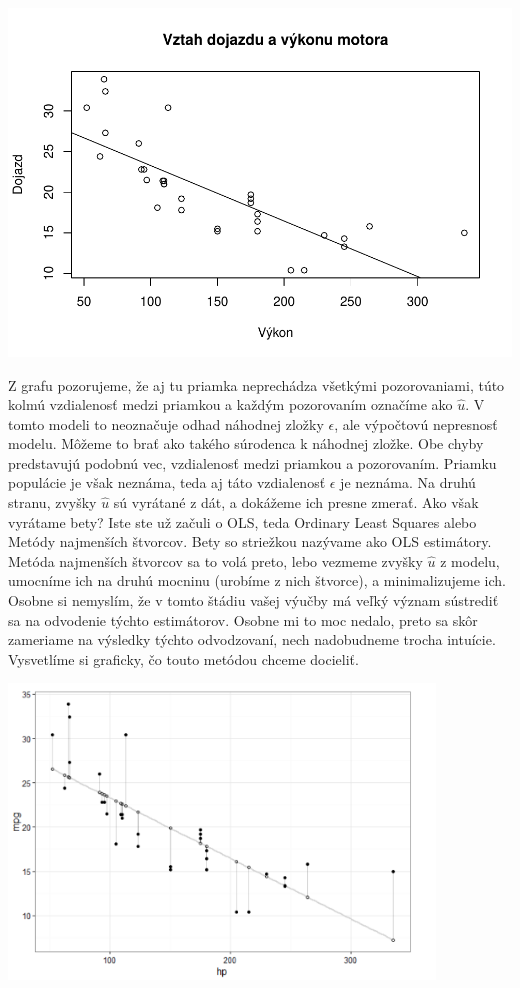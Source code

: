 \documentclass[]{article}
\begin{document}
\includegraphics{test_files/figure-latex/unnamed-chunk-41-1.pdf}

Z grafu pozorujeme, že aj tu priamka neprechádza všetkými pozorovaniami,
túto kolmú vzdialenosť medzi priamkou a každým pozorovaním označíme ako
\(\hat{u}\). V tomto modeli to neoznačuje odhad náhodnej zložky
\(\epsilon\), ale výpočtovú nepresnosť modelu. Môžeme to brať ako takého
súrodenca k náhodnej zložke. Obe chyby predstavujú podobnú vec,
vzdialenosť medzi priamkou a pozorovaním. Priamku populácie je však
neznáma, teda aj táto vzdialenosť \(\epsilon\) je neznáma. Na druhú
stranu, zvyšky \(\hat{u}\) sú vyrátané z dát, a dokážeme ich presne
zmerať. Ako však vyrátame bety? Iste ste už začuli o OLS, teda Ordinary
Least Squares alebo Metódy najmenších štvorcov. Bety so striežkou
nazývame ako OLS estimátory. Metóda najmenších štvorcov sa to volá
preto, lebo vezmeme zvyšky \(\hat{u}\) z modelu, umocníme ich na druhú
mocninu (urobíme z nich štvorce), a minimalizujeme ich. Osobne si
nemyslím, že v tomto štádiu vašej výučby má veľký význam sústrediť sa na
odvodenie týchto estimátorov. Osobne mi to moc nedalo, preto sa skôr
zameriame na výsledky týchto odvodzovaní, nech nadobudneme trocha
intuície. Vysvetlíme si graficky, čo touto metódou chceme docieliť.

\begin{center}

\includegraphics[width=0.85\textwidth,height=\textheight]{diplomka obrazky/4.png}

\end{center}
\end{document}
